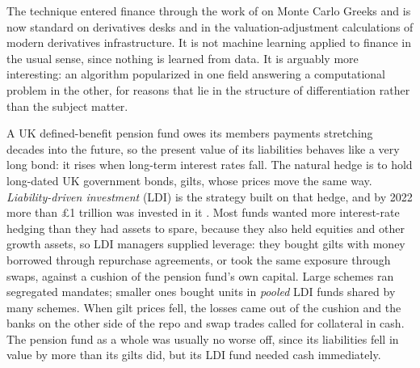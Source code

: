 \documentclass[../ai_in_finance]{subfiles}
\begin{document}
The technique entered finance through the work of \textcite{giles2006smoking} on Monte Carlo Greeks and is now standard on derivatives desks and in the valuation-adjustment calculations of modern derivatives infrastructure. It is not machine learning applied to finance in the usual sense, since nothing is learned from data. It is arguably more interesting: an algorithm popularized in one field answering a computational problem in the other, for reasons that lie in the structure of differentiation rather than the subject matter.

\label{sec:ldi-vignette}

A UK defined-benefit pension fund owes its members payments stretching decades into the future, so the present value of its liabilities behaves like a very long bond: it rises when long-term interest rates fall. The natural hedge is to hold long-dated UK government bonds, gilts, whose prices move the same way. \emph{Liability-driven investment} (LDI) is the strategy built on that hedge, and by 2022 more than \pounds1 trillion was invested in it \parencite{cunliffe2022ldi}. Most funds wanted more interest-rate hedging than they had assets to spare, because they also held equities and other growth assets, so LDI managers supplied leverage: they bought gilts with money borrowed through repurchase agreements, or took the same exposure through swaps, against a cushion of the pension fund's own capital. Large schemes ran segregated mandates; smaller ones bought units in \emph{pooled} LDI funds shared by many schemes. When gilt prices fell, the losses came out of the cushion and the banks on the other side of the repo and swap trades called for collateral in cash. The pension fund as a whole was usually no worse off, since its liabilities fell in value by more than its gilts did, but its LDI fund needed cash immediately.
\end{document}
